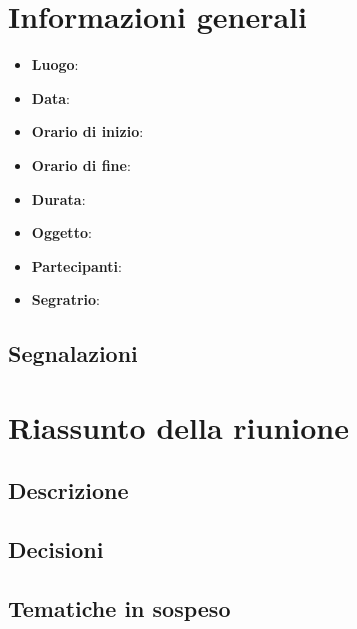 \documentclass[a4paper,titlepage]{article}
\begin{document}
\maketitle
\begin{diario}
\end{diario}
\newpage
\tableofcontents

\newpage
\section{Informazioni generali}
\label{sec:Informazioni}

\begin{itemize}
  \item \textbf{Luogo}: 
  \item \textbf{Data}: 
  \item \textbf{Orario di inizio}:
  \item \textbf{Orario di fine}: 
  \item \textbf{Durata}:
  \item \textbf{Oggetto}:  
  \item \textbf{Partecipanti}:
  \item \textbf{Segratrio}:  

\end{itemize}
\subsection{Segnalazioni}
\newpage
\section{Riassunto della riunione}
\label{sec:RiassuntoRiunione}
 \subsection{Descrizione}
 \subsection{Decisioni}
 \subsection{Tematiche in sospeso}
\end{document}
